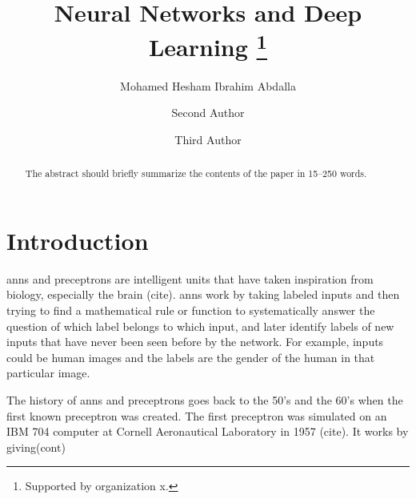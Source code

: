 \documentclass[runningheads]{llncs}
\begin{document}
%
\title{Neural Networks and Deep Learning \thanks{Supported by organization x.}}
%
%
\author{Mohamed Hesham Ibrahim Abdalla \and
Second Author \and
Third Author}
%
%
%
\maketitle              %
%
\begin{abstract}
The abstract should briefly summarize the contents of the paper in
15--250 words.

\end{abstract}
%
%
%
\section{Introduction}

\gls{anns} and preceptrons are intelligent units that have taken inspiration
from biology, especially the brain (cite). \gls{anns} work by taking labeled inputs
and then trying to find a mathematical rule or function to systematically answer the question
of which label belongs to which input, and later identify labels of new inputs that have never been seen before by the network. For example, inputs could be human images and the labels are 
the gender of the human in that particular image.

The history of \gls{anns} and preceptrons goes back to the 50's and the 60's when 
the first known preceptron was created. The first preceptron was simulated on an IBM 704 computer at Cornell Aeronautical Laboratory in 1957 (cite).  It works by giving(cont)
\end{document}

